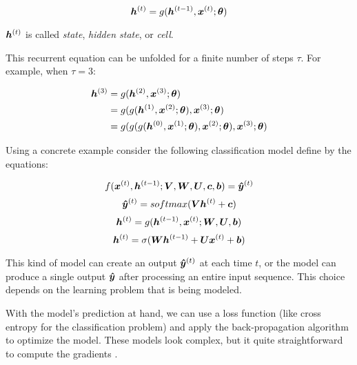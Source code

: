 \begin{equation}
\bm{h}^{(t)} = g(\bm{h}^{(t-1)}, \bm{x}^{(t)}; \bm{\theta})
\end{equation}

$\bm{h}^{(t)}$ is called \textit{state}, \textit{hidden state}, or \textit{cell}.


\par This recurrent equation can be unfolded for a finite number of steps $\tau$. For example, when $\tau =3$:

\begin{align}
\bm{h}^{(3)}& = g(\bm{h}^{(2)}, \bm{x}^{(3)}; \bm{\theta})\\
 & = g(g(\bm{h}^{(1)}, \bm{x}^{(2)}; \bm{\theta}), \bm{x}^{(3)}; \bm{\theta})\\
 & = g(g(g(\bm{h}^{(0)}, \bm{x}^{(1)}; \bm{\theta}), \bm{x}^{(2)}; \bm{\theta}), \bm{x}^{(3)}; \bm{\theta})\\
\end{align}

Using a concrete example consider the following classification model define by the equations:

\begin{equation}
f(\bm{x}^{(t)}, \bm{h}^{(t-1)}; \bm{V}, \bm{W}, \bm{U}, \bm{c}, \bm{b}) = \bm{\hat{y}}^{(t)}
\end{equation}
 \vspace{0.2cm}
\begin{equation}
\bm{\hat{y}}^{(t)} = softmax(\bm{V} \bm{h}^{(t)} + \bm{c})
\end{equation}
\vspace{0.2cm}
 \begin{equation}
\bm{h}^{(t)} = g(\bm{h}^{(t-1)}, \bm{x}^{(t)}; \bm{W},\bm{U}, \bm{b})
\end{equation}
\vspace{0.2cm}
\begin{equation}
\bm{h}^{(t)} = \sigma(\bm{W} \bm{h}^{(t-1)} + \bm{U} \bm{x}^{(t)} + \bm{b})
\end{equation}


This kind of model can create an output $\bm{\hat{y}}^{(t)}$ at each time $t$, or the model can produce a single output $\bm{\hat{y}}$ after processing an entire input sequence. This choice depends on the learning problem that is being modeled.


With the model's prediction at hand, we can use a loss function (like cross entropy for the classification problem) and apply the back-propagation algorithm to optimize the model. These models look complex, but it quite straightforward to compute the gradients \cite[p.~374]{DeepLearningbook}.

